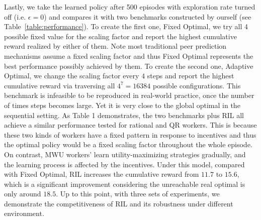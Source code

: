 Lastly, we take the learned policy after 500 episodes with exploration rate turned off (i.e. $\epsilon =0$) and compares it with two benchmarks constructed by ourself (see Table~\ref{table:performance}). To create the first one, Fixed Optimal, we try all 4 possible fixed value for the scaling factor and report the highest cumulative reward realized by either of them. Note most traditional peer prediction mechanisms assume a fixed scaling factor and thus Fixed Optimal represents the best performance possibly achieved by them.
To create the second one, Adaptive Optimal, we change the scaling factor every $4$ steps and report the highest cumulative reward via traversing all $4^7=16384$ possible configurations. This benchmark is infeasible to be reproduced in real-world practice, once the number of times steps becomes large. Yet it is very close to the global optimal in the sequential setting.
As Table 1 demonstrates, the two benchmarks plus RIL all achieve a similar performance tested for rational and QR workers.
This is because these two kinds of workers have a fixed pattern in response to incentives and thus the optimal policy would be a fixed scaling factor throughout the whole episode.
On contrast, MWU workers' learn utility-maximizing strategies gradually, and the learning process is affected by the incentives. Under this model, compared with Fixed Optimal, RIL increases the cumulative reward from $11.7$ to $15.6$, which is a significant improvement considering the unreachable real optimal is only around $18.5$. Up to this point, with three sets of experiments, we demonstrate the competitiveness of RIL and its robustness under different environment.%

